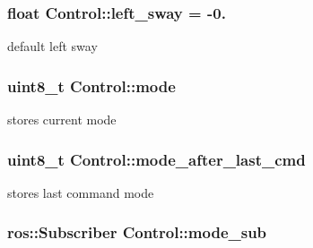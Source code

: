 \subsubsection[{\texorpdfstring{left\+\_\+sway}{left_sway}}]{\setlength{\rightskip}{0pt plus 5cm}float Control\+::left\+\_\+sway = -\/0.\hspace{0.3cm}{\ttfamily [private]}}\hypertarget{classControl_a13598dbba398020d32610a1318217b29}{}\label{classControl_a13598dbba398020d32610a1318217b29}


default left sway 

\subsubsection[{\texorpdfstring{mode}{mode}}]{\setlength{\rightskip}{0pt plus 5cm}uint8\+\_\+t Control\+::mode\hspace{0.3cm}{\ttfamily [private]}}\hypertarget{classControl_ad55ea3c85c8b2d428e7c9a6d92c80f25}{}\label{classControl_ad55ea3c85c8b2d428e7c9a6d92c80f25}


stores current mode 

\subsubsection[{\texorpdfstring{mode\+\_\+after\+\_\+last\+\_\+cmd}{mode_after_last_cmd}}]{\setlength{\rightskip}{0pt plus 5cm}uint8\+\_\+t Control\+::mode\+\_\+after\+\_\+last\+\_\+cmd\hspace{0.3cm}{\ttfamily [private]}}\hypertarget{classControl_a8775fce3fa356ec18f05a199e2e018c4}{}\label{classControl_a8775fce3fa356ec18f05a199e2e018c4}


stores last command mode 

\subsubsection[{\texorpdfstring{mode\+\_\+sub}{mode_sub}}]{\setlength{\rightskip}{0pt plus 5cm}ros\+::\+Subscriber Control\+::mode\+\_\+sub\hspace{0.3cm}{\ttfamily [private]}}\hypertarget{classControl_aa69c6ea7a8de7db73035a1db99ab3b47}{}\label{classControl_aa69c6ea7a8de7db73035a1db99ab3b47}


